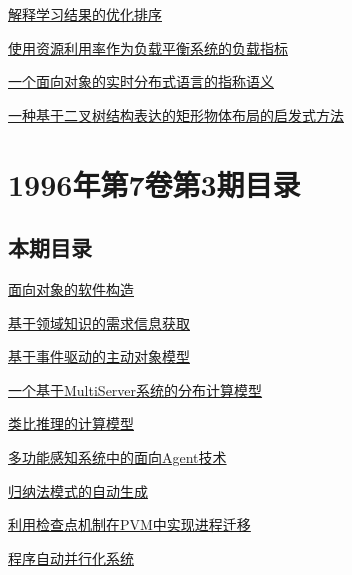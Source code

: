 \documentclass[a4paper]{article}
\begin{document}
\href{http://www.jos.org.cn/ch/reader/download_pdf.aspx?file_no=19960406&year_id=1996&quarter_id=4&falg=1}{解释学习结果的优化排序}

\href{http://www.jos.org.cn/ch/reader/download_pdf.aspx?file_no=19960407&year_id=1996&quarter_id=4&falg=1}{使用资源利用率作为负载平衡系统的负载指标}

\href{http://www.jos.org.cn/ch/reader/download_pdf.aspx?file_no=19960408&year_id=1996&quarter_id=4&falg=1}{一个面向对象的实时分布式语言的指称语义}

\href{http://www.jos.org.cn/ch/reader/download_pdf.aspx?file_no=19960409&year_id=1996&quarter_id=4&falg=1}{一种基于二叉树结构表达的矩形物体布局的启发式方法}


\section{\textbf{1996年第7卷第3期目录}}
\subsection{本期目录}
\href{http://www.jos.org.cn/ch/reader/download_pdf.aspx?file_no=19960301&year_id=1996&quarter_id=3&falg=1}{面向对象的软件构造}

\href{http://www.jos.org.cn/ch/reader/download_pdf.aspx?file_no=19960302&year_id=1996&quarter_id=3&falg=1}{基于领域知识的需求信息获取}

\href{http://www.jos.org.cn/ch/reader/download_pdf.aspx?file_no=19960303&year_id=1996&quarter_id=3&falg=1}{基于事件驱动的主动对象模型}

\href{http://www.jos.org.cn/ch/reader/download_pdf.aspx?file_no=19960304&year_id=1996&quarter_id=3&falg=1}{一个基于MultiServer系统的分布计算模型}

\href{http://www.jos.org.cn/ch/reader/download_pdf.aspx?file_no=19960305&year_id=1996&quarter_id=3&falg=1}{类比推理的计算模型}

\href{http://www.jos.org.cn/ch/reader/download_pdf.aspx?file_no=19960306&year_id=1996&quarter_id=3&falg=1}{多功能感知系统中的面向Agent技术}

\href{http://www.jos.org.cn/ch/reader/download_pdf.aspx?file_no=19960307&year_id=1996&quarter_id=3&falg=1}{归纳法模式的自动生成}

\href{http://www.jos.org.cn/ch/reader/download_pdf.aspx?file_no=19960308&year_id=1996&quarter_id=3&falg=1}{利用检查点机制在PVM中实现进程迁移}

\href{http://www.jos.org.cn/ch/reader/download_pdf.aspx?file_no=19960309&year_id=1996&quarter_id=3&falg=1}{程序自动并行化系统}
\end{document}
